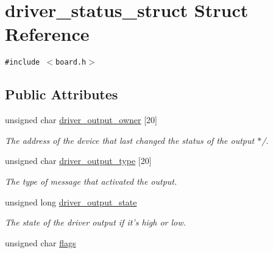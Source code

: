\hypertarget{structdriver__status__struct}{
\section{driver\_\-status\_\-struct Struct Reference}
\label{structdriver__status__struct}
}
{\tt \#include $<$board.h$>$}

\subsection*{Public Attributes}
\begin{CompactItemize}
\item 
\hypertarget{structdriver__status__struct_8ed5b4a9b58915558d8e1067ee1a8e8d}{
unsigned char \hyperlink{structdriver__status__struct_8ed5b4a9b58915558d8e1067ee1a8e8d}{driver\_\-output\_\-owner} \mbox{[}20\mbox{]}}
\label{structdriver__status__struct_8ed5b4a9b58915558d8e1067ee1a8e8d}

\begin{CompactList}\small\item\em The address of the device that last changed the status of the output $\ast$/. \item\end{CompactList}\item 
\hypertarget{structdriver__status__struct_edb97f515bcc43e83af13022a70835b9}{
unsigned char \hyperlink{structdriver__status__struct_edb97f515bcc43e83af13022a70835b9}{driver\_\-output\_\-type} \mbox{[}20\mbox{]}}
\label{structdriver__status__struct_edb97f515bcc43e83af13022a70835b9}

\begin{CompactList}\small\item\em The type of message that activated the output. \item\end{CompactList}\item 
\hypertarget{structdriver__status__struct_50118c1fccf9a754db89e1cbad68f153}{
unsigned long \hyperlink{structdriver__status__struct_50118c1fccf9a754db89e1cbad68f153}{driver\_\-output\_\-state}}
\label{structdriver__status__struct_50118c1fccf9a754db89e1cbad68f153}

\begin{CompactList}\small\item\em The state of the driver output if it's high or low. \item\end{CompactList}\item 
\hypertarget{structdriver__status__struct_b98bf2de8391ab2d365444dcd5c5ca6f}{
unsigned char \hyperlink{structdriver__status__struct_b98bf2de8391ab2d365444dcd5c5ca6f}{flags}}
\label{structdriver__status__struct_b98bf2de8391ab2d365444dcd5c5ca6f}


\end{CompactItemize}
